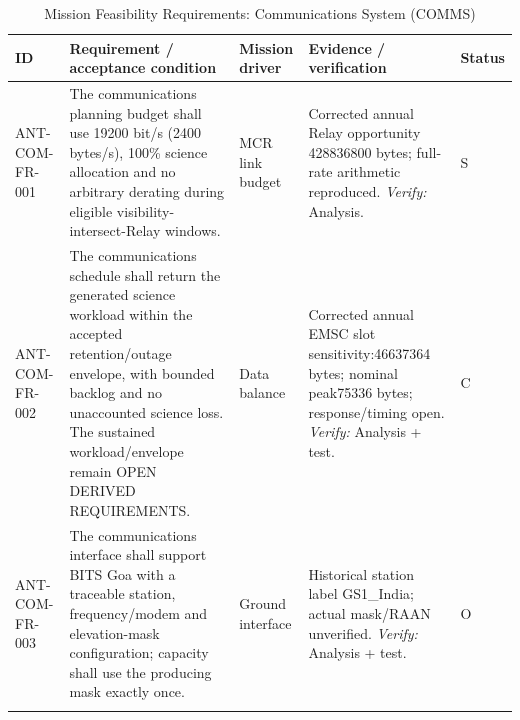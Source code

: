\begin{table}[H]\centering\small\setlength{\tabcolsep}{3pt}
\caption{Mission Feasibility Requirements: Communications System (COMMS)}\label{tab:fr-com}
\begin{tabular}{@{}
>{\RaggedRight\arraybackslash}p{}
>{\RaggedRight\arraybackslash}p{}
>{\RaggedRight\arraybackslash}p{}
>{\RaggedRight\arraybackslash}p{}
>{\RaggedRight\arraybackslash}p{}
@{}}
\toprule ID & Requirement / acceptance condition & Mission driver & Evidence / verification & Status\\\midrule
{}\label{req:ANT-COM-FR-001}\mbox{ANT-COM-}\newline\mbox{FR-001} & The communications planning budget shall use 19200 bit/s (2400 bytes/s), 100\% science allocation and no arbitrary derating during eligible visibility-intersect-Relay windows. & MCR link budget & Corrected annual Relay opportunity 428836800 bytes; full-rate arithmetic reproduced. \emph{Verify:} Analysis. & S\\
\addlinespace[3pt]
\label{req:ANT-COM-FR-002}\mbox{ANT-COM-}\newline\mbox{FR-002} & The communications schedule shall return the generated science workload within the accepted retention/outage envelope, with bounded backlog and no unaccounted science loss. The sustained workload/envelope remain OPEN DERIVED REQUIREMENTS. & Data balance & Corrected annual EMSC slot sensitivity:46637364 bytes; nominal peak75336 bytes; response/timing open. \emph{Verify:} Analysis + test. & C\\
\addlinespace[3pt]
\label{req:ANT-COM-FR-003}\mbox{ANT-COM-}\newline\mbox{FR-003} & The communications interface shall support BITS Goa with a traceable station, frequency/modem and elevation-mask configuration; capacity shall use the producing mask exactly once. & Ground interface & Historical station label GS1\_India; actual mask/RAAN unverified. \emph{Verify:} Analysis + test. & O\\
\addlinespace[3pt]
\bottomrule
\end{tabular}
\end{table}

